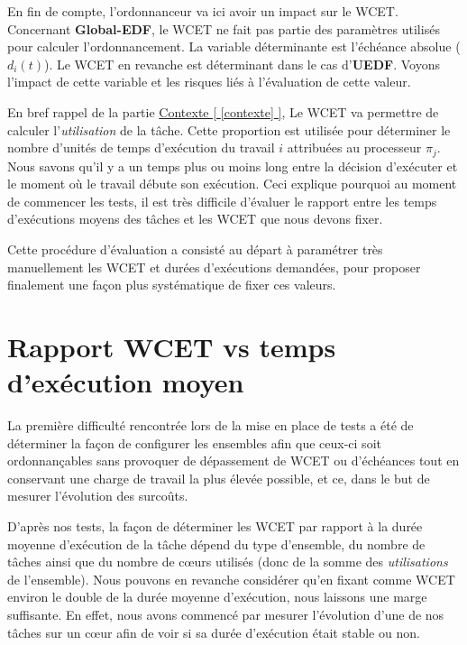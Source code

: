 	En fin de compte, l'ordonnanceur va ici avoir un impact sur le WCET. 
	Concernant \textbf{Global-EDF}, le WCET ne fait pas partie des paramètres utilisés pour calculer 
	l'ordonnancement. La variable déterminante est l'échéance absolue ($d_i(t)$). 
	Le WCET en revanche est déterminant dans le cas d'\textbf{UEDF}. Voyons 
	l'impact de cette variable et les risques liés à l'évaluation de cette valeur.\newline
	
	En bref rappel de la partie \hyperref[contexte]{Contexte [ \ref{contexte} ]}, 
	Le WCET va permettre de calculer l'\textit{utilisation} de la tâche. 
	Cette proportion est utilisée pour déterminer le nombre d'unités de temps d'exécution 
	du travail $i$ attribuées au processeur $\pi_j$. \newline
	Nous savons qu'il y a un temps plus ou moins long entre la décision d'exécuter et le moment 
	où le travail débute son exécution. Ceci explique pourquoi au moment de commencer les tests, 
	il est très difficile d'évaluer le rapport entre les temps d'exécutions 
	moyens des tâches et les WCET que nous devons fixer. \newline
	
	Cette procédure d'évaluation a consisté au départ à paramétrer très manuellement les WCET et 
	durées d'exécutions demandées, pour proposer finalement une façon plus systématique 
	de fixer ces valeurs.


\section{Rapport WCET vs temps d'exécution moyen}

La première difficulté rencontrée lors de la mise en place de tests a été de déterminer la façon 
de configurer les ensembles afin que ceux-ci soit ordonnançables sans provoquer de 
dépassement de WCET ou d'échéances tout en conservant une charge de travail la plus élevée possible, et ce, dans le 
but de mesurer l'évolution des surcoûts.

D'après nos tests, la façon de déterminer les WCET par rapport à la durée moyenne d'exécution de la tâche 
dépend du type d'ensemble, 
du nombre de tâches ainsi que du nombre de cœurs utilisés (donc de la somme des \textit{utilisations} de l'ensemble).
Nous pouvons en revanche considérer qu'en fixant comme WCET environ le double 
de la durée moyenne d'exécution, nous laissons une marge suffisante. En effet, nous avons commencé 
par mesurer l'évolution d'une de nos tâches sur un cœur afin de voir si sa durée d'exécution était 
stable ou non.

